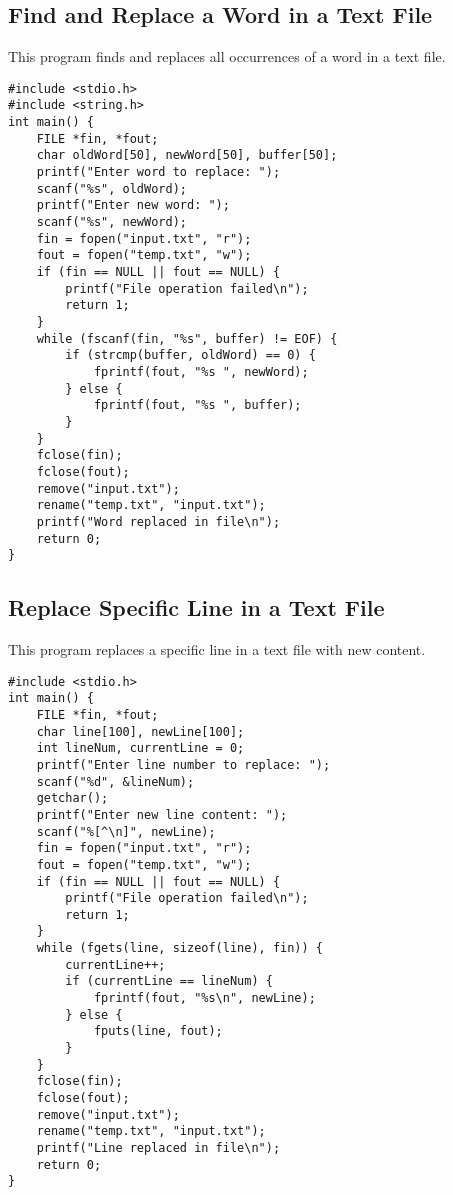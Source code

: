 \documentclass[a4paper,12pt]{article}
\begin{document}
\subsection{Find and Replace a Word in a Text File}
This program finds and replaces all occurrences of a word in a text file.
\begin{lstlisting}[caption={Find and Replace a Word in a Text File}]
#include <stdio.h>
#include <string.h>
int main() {
    FILE *fin, *fout;
    char oldWord[50], newWord[50], buffer[50];
    printf("Enter word to replace: ");
    scanf("%s", oldWord);
    printf("Enter new word: ");
    scanf("%s", newWord);
    fin = fopen("input.txt", "r");
    fout = fopen("temp.txt", "w");
    if (fin == NULL || fout == NULL) {
        printf("File operation failed\n");
        return 1;
    }
    while (fscanf(fin, "%s", buffer) != EOF) {
        if (strcmp(buffer, oldWord) == 0) {
            fprintf(fout, "%s ", newWord);
        } else {
            fprintf(fout, "%s ", buffer);
        }
    }
    fclose(fin);
    fclose(fout);
    remove("input.txt");
    rename("temp.txt", "input.txt");
    printf("Word replaced in file\n");
    return 0;
}
\end{lstlisting}
\clearpage

\subsection{Replace Specific Line in a Text File}
This program replaces a specific line in a text file with new content.
\begin{lstlisting}[caption={Replace Specific Line in a Text File}]
#include <stdio.h>
int main() {
    FILE *fin, *fout;
    char line[100], newLine[100];
    int lineNum, currentLine = 0;
    printf("Enter line number to replace: ");
    scanf("%d", &lineNum);
    getchar();
    printf("Enter new line content: ");
    scanf("%[^\n]", newLine);
    fin = fopen("input.txt", "r");
    fout = fopen("temp.txt", "w");
    if (fin == NULL || fout == NULL) {
        printf("File operation failed\n");
        return 1;
    }
    while (fgets(line, sizeof(line), fin)) {
        currentLine++;
        if (currentLine == lineNum) {
            fprintf(fout, "%s\n", newLine);
        } else {
            fputs(line, fout);
        }
    }
    fclose(fin);
    fclose(fout);
    remove("input.txt");
    rename("temp.txt", "input.txt");
    printf("Line replaced in file\n");
    return 0;
}
\end{lstlisting}
\clearpage
\end{document}
